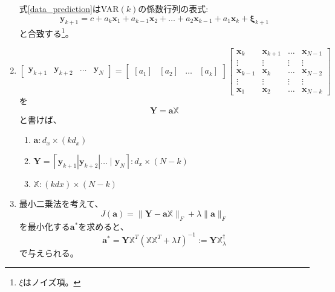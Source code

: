 \begin{enumerate}
    式\eqref{data_prediction}はVAR$(k)$の係数行列の表式:
    \begin{equation}\label{VAR}
        \mathbf{y}_{k+1}=c+a_k \mathbf{x}_1+a_{k-1} \mathbf{x}_2+\ldots+a_2 \mathbf{x}_{k-1}+a_1 \mathbf{x}_k+\boldsymbol{\xi}_{k+1}
        \end{equation}
    と合致する\footnote{$\xi$はノイズ項。}。
    \item
    \begin{equation}
        \left[\begin{array}{llll}
        \mathbf{y}_{k+1} & \mathbf{y}_{k+2} & \ldots & \mathbf{y}_N
        \end{array}\right]=\left[\begin{array}{llll}
        {\left[a_1\right]} & {\left[a_2\right]} & \ldots & {\left[a_k\right]}
        \end{array}\right]\left[\begin{array}{cccc} 
        \mathbf{x}_k & \mathbf{x}_{k+1} & \ldots & \mathbf{x}_{N-1} \\
        \vdots　& \vdots & \vdots　& \vdots\\
        \mathbf{x}_{k-1} & \mathbf{x}_k & \ldots & \mathbf{x}_{N-2} \\
        \vdots & \vdots & \vdots & \vdots \\
        \mathbf{x}_1 & \mathbf{x}_2 & \ldots &　\mathbf{x}_{N-k}
        \end{array}\right]
    \end{equation}
    を
    $$
    \mathbf{Y}=\mathbf{a} \mathbb{X}
    $$
    と書けば、
    \begin{enumerate}
        \item $\mathbf{a}: d_x \times\left(k d_x\right)$
        \item $\mathbf{Y}=\left\lceil\mathbf{y}_{k+1}\left|\mathbf{y}_{k+2}\right| \ldots \mid \mathbf{y}_N\right\rceil: d_x \times(N-k)$ 
        \item $\mathbb{X}:(k d x) \times(N-k)$
    \end{enumerate}
    \item 
    最小二乗法を考えて、
        \begin{equation}
        J(\mathbf{a})=\|\mathbf{Y}-\mathbf{a} \mathbb{X}\|_F+\lambda\|\mathbf{a}\|_F
        \end{equation}
    を最小化する$\mathbf{a}^*$を求めると、
    \begin{equation}
        \mathbf{a}^*=\mathbf{Y} \mathbb{X}^T\left(\mathbb{X X}^T+\lambda I\right)^{-1}:=\mathbf{Y} \mathbb{X}_\lambda^{\dagger}
    \end{equation}
    で与えられる。
\end{enumerate}

